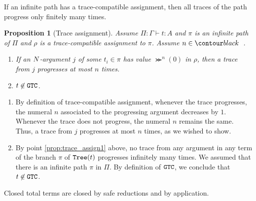 \documentclass{article}
\newtheorem{proposition}[theorem]{Proposition}
\newenvironment{proof}[1][Proof]{\begin{trivlist}
\item[\hskip \labelsep {\bfseries #1}]}{\end{trivlist}}
\begin{document}
If an infinite path has a trace-compatible assignment, then all traces of the path progress only finitely many times.

\begin{proposition}[Trace assignment]
\label{prop:trace_assign}
Assume $\Pi:\Gamma \vdash t:A$ and $\pi$ is an infinite path of $\Pi$ and
$\rho$ is a trace-compatible assignment to $\pi$. Assume $n \in \Nat$.
\begin{enumerate}
\item
\label{prop:trace_assign1}
If an ${N}$-argument $j$ of some $t_i \in \pi$ has value $\Succ^n(0)$ in $\rho$, then a trace
from $j$ progresses at most $n$ times.
\item
\label{prop:trace_assign2}
$t \not \in {\tt GTC}$.
\end{enumerate}
\end{proposition}

\begin{proof}
\begin{enumerate}
\item
By definition of trace-compatible assignment, whenever the trace progresses, 
the numeral $n$ associated to the progressing argument decreases by $1$.
Whenever the trace does not progress, the numeral $n$ remains the same.
Thus, a trace from $j$ progresses at most $n$ times, as we wished to show.
\item
By point \ref{prop:trace_assign1} above, 
no trace from any argument in any term of the branch $\pi$ of ${\tt Tree}(t)$ progresses infinitely many times.
We assumed that there is an infinite path $\pi$ in $\Pi$.
By definition of ${\tt GTC}$, we conclude that $t \not \in {\tt GTC}$. 
\end{enumerate}
\end{proof}

Closed total terms are closed by safe reductions and by application. 
\end{document}
